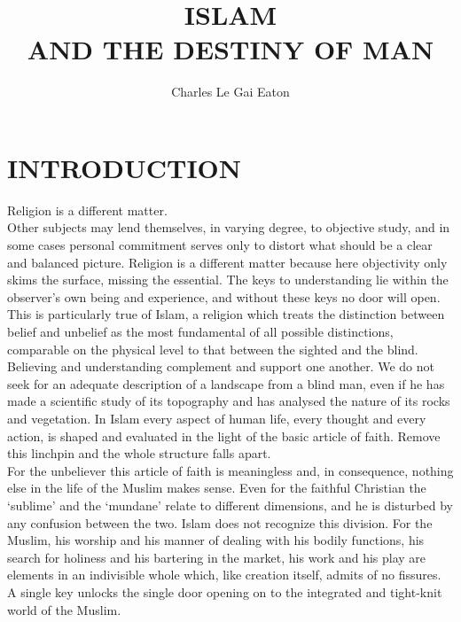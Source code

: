 \documentclass[10pt, twoside,openright]{book}
\title{\Huge \textbf{\textsc{ISLAM}\\ \Large AND THE DESTINY OF MAN}}
\author{\large Charles Le Gai Eaton}
\date{ }
\begin{document}


\maketitle
\tableofcontents


\pagestyle{fancy}
\fancyhf{}
\fancyhead[RO,LE]{\normalsize\thepage}
\renewcommand{\headrulewidth}{0pt}
\renewcommand{\footrulewidth}{0pt}
\renewcommand{\headsep}{3pt}

\renewcommand\footnoterule{\rule{0pt}{0pt}}
\setlength{\skip\footins}{5mm}


\chapter{INTRODUCTION}

Religion is a different matter.\\

Other subjects may lend themselves, in varying degree, to objective study, and in some cases personal commitment serves only to distort what should be a clear and balanced picture. Religion is a different matter because here objectivity only skims the surface, missing the essential. The keys to understanding lie within the observer's own being and experience, and without these keys no door will open. This is particularly true of Islam, a religion which treats the distinction between belief and unbelief as the most fundamental of all possible distinctions, comparable on the physical level to that between the sighted and the blind. Believing and understanding complement and support one another. We do not seek for an adequate description of a landscape from a blind man, even if he has made a scientific study of its topography and has analysed the nature of its rocks and vegetation. In Islam every aspect of human life, every thought and every action, is shaped and evaluated in the light of the basic article of faith. Remove this linchpin and the whole structure falls apart.\\

For the unbeliever this article of faith is meaningless and, in consequence, nothing else in the life of the Muslim makes sense. Even for the faithful Christian the `sublime' and the `mundane' relate to different dimensions, and he is disturbed by any confusion between the two. Islam does not recognize this division. For the Muslim, his worship and his manner of dealing with his bodily functions, his search for holiness and his bartering in the market, his work and his play are elements in an indivisible whole which, like creation itself, admits of no fissures. A single key unlocks the single door opening on to the integrated and tight\hyp{}knit world of the Muslim.\\
\end{document}
